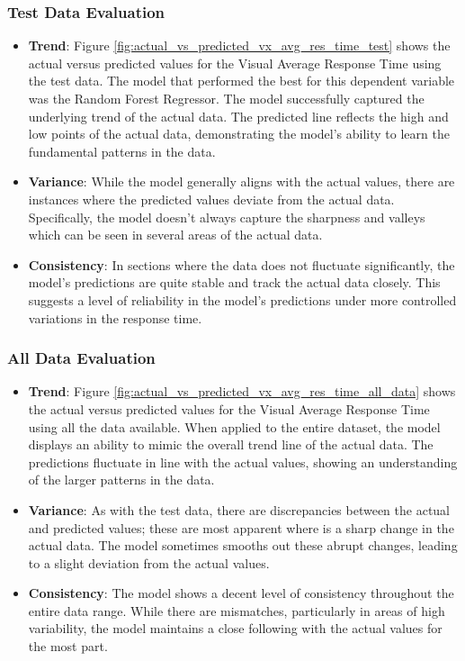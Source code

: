 \subsubsection*{Test Data Evaluation}

\begin{itemize}
    \item \textbf{Trend}: Figure \ref{fig:actual_vs_predicted_vx_avg_res_time_test} shows the actual versus predicted values for the Visual Average Response Time using the test data.
          The model that performed the best for this dependent variable was the Random Forest Regressor. The model successfully captured the underlying trend of the actual data. The predicted line
          reflects the high and low points of the actual data, demonstrating the model's ability to learn the fundamental patterns in the data.
    \item \textbf{Variance}: While the model generally aligns with the actual values, there are instances where the predicted values deviate from the actual data. Specifically, the model doesn't
          always capture the sharpness and valleys which can be seen in several areas of the actual data.
    \item \textbf{Consistency}: In sections where the data does not fluctuate significantly, the model's predictions are quite stable and track the actual data closely. This suggests a level
          of reliability in the model's predictions under more controlled variations in the response time.
\end{itemize}

\subsubsection*{All Data Evaluation}

\begin{itemize}
    \item \textbf{Trend}: Figure \ref{fig:actual_vs_predicted_vx_avg_res_time_all_data} shows the actual versus predicted values for the Visual Average Response Time using all the data available.
          When applied to the entire dataset, the model displays an ability to mimic the overall trend line of the actual data. The predictions fluctuate in line with the actual values,
          showing an understanding of the larger patterns in the data.
    \item \textbf{Variance}: As with the test data, there are discrepancies between the actual and predicted values; these are most apparent where is a sharp change in the actual data.
          The model sometimes smooths out these abrupt changes, leading to a slight deviation from the actual values.
    \item \textbf{Consistency}: The model shows a decent level of consistency throughout the entire data range. While there are mismatches, particularly in areas of high variability,
          the model maintains a close following with the actual values for the most part.
\end{itemize}

